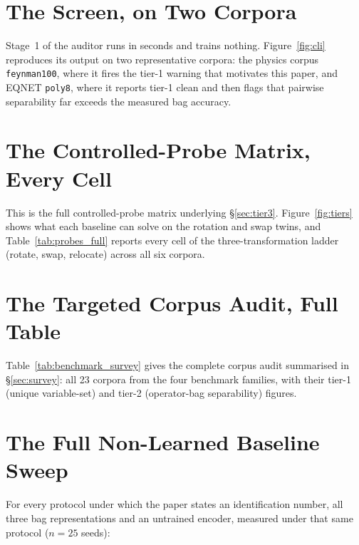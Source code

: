 \appendix
\raggedbottom

\section{The Screen, on Two Corpora}
\label{app:cli}

Stage~1 of the auditor runs in seconds and trains nothing. Figure~\ref{fig:cli} reproduces its
output on two representative corpora: the physics corpus \texttt{feynman100}, where it fires the
tier-1 warning that motivates this paper, and EQNET \texttt{poly8}, where it reports tier-1 clean
and then flags that pairwise separability far exceeds the measured bag accuracy.



\section{The Controlled-Probe Matrix, Every Cell}
\label{app:probes}

This is the full controlled-probe matrix underlying \S\ref{sec:tier3}. Figure~\ref{fig:tiers} shows
what each baseline can solve on the rotation and swap twins, and Table~\ref{tab:probes_full} reports
every cell of the three-transformation ladder (rotate, swap, relocate) across all six corpora.





\section{The Targeted Corpus Audit, Full Table}
\label{app:survey}

Table~\ref{tab:benchmark_survey} gives the complete corpus audit summarised in \S\ref{sec:survey}:
all 23 corpora from the four benchmark families, with their tier-1 (unique variable-set) and tier-2
(operator-bag separability) figures.



\section{The Full Non-Learned Baseline Sweep}
\label{app:sweep}

For every protocol under which the paper states an identification number, all three bag
representations and an untrained encoder, measured under that same protocol ($n{=}25$ seeds):

